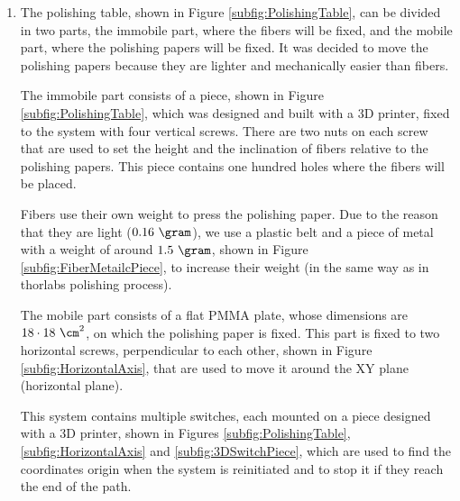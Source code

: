 \begin{enumerate}
\item{} The polishing table, shown in Figure \ref{subfig:PolishingTable}, can be divided in two parts, the immobile part, where the fibers will be fixed, and the mobile part, where the polishing papers will be fixed. It was decided to move the polishing papers because they are lighter and mechanically easier than fibers.

The immobile part consists of a piece, shown in Figure \ref{subfig:PolishingTable}, which was designed and built with a 3D printer, fixed to the system with four vertical screws. There are two nuts on each screw that are used to set the height and the inclination of fibers relative to the polishing papers. This piece contains one hundred holes where the fibers will be placed. 

Fibers use their own weight to press the polishing paper. Due to the reason that they are light ($0.16~\gram$), we use a plastic belt and a piece of metal with a weight of around $1.5~\gram$, shown in Figure \ref{subfig:FiberMetailcPiece}, to increase their weight (in the same way as in thorlabs polishing process).

The mobile part consists of a flat PMMA plate, whose dimensions are $18 \cdot{} 18~\cm^2$, on which the polishing paper is fixed. This part is fixed to two horizontal screws, perpendicular to each other, shown in Figure \ref{subfig:HorizontalAxis}, that are used to move it around the XY plane (horizontal plane).

This system contains multiple switches, each mounted on a piece designed with a 3D printer, shown in Figures \ref{subfig:PolishingTable}, \ref{subfig:HorizontalAxis} and \ref{subfig:3DSwitchPiece}, which are used to find the coordinates origin when the system is reinitiated and to stop it if they reach the end of the path. 


\end{enumerate}
